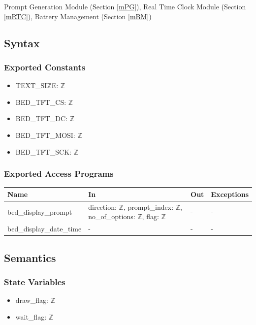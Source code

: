 \documentclass[12pt, titlepage]{article}
\begin{document}
Prompt Generation Module (Section \ref{mPG}), Real Time Clock Module (Section \ref{mRTC}), Battery Management (Section \ref{mBM})

\subsection{Syntax}

\subsubsection{Exported Constants}

\begin{itemize}
\item TEXT\_SI$\mathbb{Z}$E: $\mathbb{Z}$
\item BED\_TFT\_CS: $\mathbb{Z}$
\item BED\_TFT\_DC: $\mathbb{Z}$
\item BED\_TFT\_MOSI: $\mathbb{Z}$
\item BED\_TFT\_SCK: $\mathbb{Z}$
\end{itemize}

\subsubsection{Exported Access Programs}

\begin{center}
\begin{tabular}{p{3cm} p{3cm} p{3.5cm} p{4cm}}
\hline
\textbf{Name} & \textbf{In} & \textbf{Out} & \textbf{Exceptions} \\
\hline
bed\_display\_prompt & direction: $\mathbb{Z}$, prompt\_index: $\mathbb{Z}$, no\_of\_options: $\mathbb{Z}$, flag: $\mathbb{Z}$ & - & -  \\
bed\_display\_date\_time & - & - & - \\
\hline
\end{tabular}
\end{center}

\subsection{Semantics}

\subsubsection{State Variables}

\begin{itemize}
\item draw\_flag: $\mathbb{Z}$
\item wait\_flag: $\mathbb{Z}$
\end{itemize}
\end{document}
